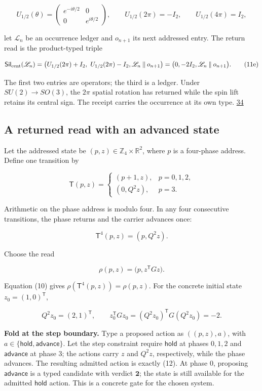 \[
U_{1/2}(\theta)=
\begin{pmatrix}e^{-i\theta/2}&0\\0&e^{i\theta/2}\end{pmatrix},
\qquad U_{1/2}(2\pi)=-I_2,\qquad U_{1/2}(4\pi)=I_2,
\]

let \(\mathscr L_n\) be an occurrence ledger and \(o_{n+1}\) its next addressed entry. The return read is the product-typed triple

\[
\mathsf{Sil}_{\rm cent}(\mathscr L_n)
=\bigl(U_{1/2}(2\pi)+I_2,\ U_{1/2}(2\pi)-I_2,
\mathscr L_n\mathbin{\|}o_{n+1}\bigr)
=\bigl(0,-2I_2,\mathscr L_n\mathbin{\|}o_{n+1}\bigr).
\tag{11e}
\]

The first two entries are operators; the third is a ledger. Under \(SU(2)\to SO(3)\), the \(2\pi\) spatial rotation has returned while the spin lift retains its central sign. The receipt carries the occurrence at its own type. \href{https://chatgpt.com/library?file_id=libfile_5167b051c248819185f3673cbcb6537d\&account_id=personal}{34}

\hypertarget{a-returned-read-with-an-advanced-state}{%
\subsection{A returned read with an advanced state}\label{a-returned-read-with-an-advanced-state}}

Let the addressed state be \((p,z)\in\mathbb Z_4\times\mathbb R^2\), where \(p\) is a four-phase address. Define one transition by

\[
\mathsf T(p,z)=
\begin{cases}
(p+1,z),&p=0,1,2,\\[2pt]
(0,Q^2z),&p=3.
\end{cases}
\tag{12}
\]

Arithmetic on the phase address is modulo four. In any four consecutive transitions, the phase returns and the carrier advances once:

\[
\mathsf T^4(p,z)=(p,Q^2z).
\tag{13}
\]

Choose the read

\[
\rho(p,z)=\bigl(p,z^{\mathsf T}Gz\bigr).
\tag{14}
\]

Equation (10) gives \(\rho(\mathsf T^4(p,z))=\rho(p,z)\). For the concrete initial state \(z_0=(1,0)^{\mathsf T}\),

\[
Q^2z_0=(2,1)^{\mathsf T},
\qquad
z_0^{\mathsf T}Gz_0
=(Q^2z_0)^{\mathsf T}G(Q^2z_0)=-2.
\tag{15}
\]

\textbf{Fold at the step boundary.} Type a proposed action as \(((p,z),a)\), with \(a\in\{\mathsf{hold},\mathsf{advance}\}\). Let the step constraint require \(\mathsf{hold}\) at phases \(0,1,2\) and \(\mathsf{advance}\) at phase \(3\); the actions carry \(z\) and \(Q^2z\), respectively, while the phase advances. The resulting admitted action is exactly (12). At phase \(0\), proposing \(\mathsf{advance}\) is a typed candidate with verdict \(\mathbf 2\); the state is still available for the admitted \(\mathsf{hold}\) action. This is a concrete gate for the chosen system.

